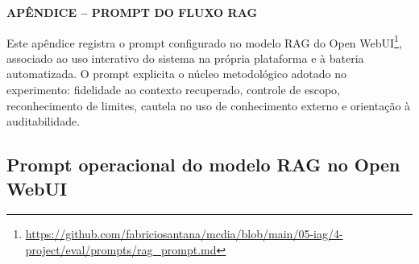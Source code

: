 \clearpage
{}
{}
\begin{center}
\textbf{APÊNDICE  -- PROMPT DO FLUXO RAG}
\end{center}
\label{sec:apendice-prompt-rag}

Este apêndice registra o prompt configurado no modelo RAG do Open WebUI\footnote{\url{https://github.com/fabriciosantana/mcdia/blob/main/05-iag/4-project/eval/prompts/rag_prompt.md}}, associado ao uso interativo do sistema na própria plataforma e à bateria automatizada. O prompt explicita o núcleo metodológico adotado no experimento: fidelidade ao contexto recuperado, controle de escopo, reconhecimento de limites, cautela no uso de conhecimento externo e orientação à auditabilidade.

\subsection{Prompt operacional do modelo RAG no Open WebUI}

